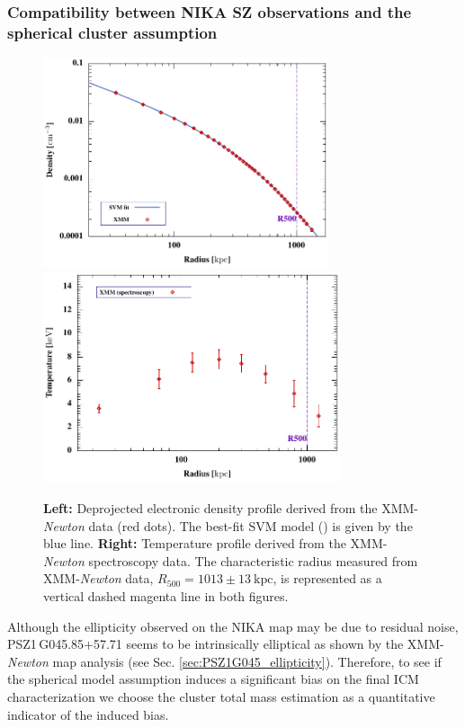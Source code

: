 \documentclass[traditabstract]{aa}
\begin{document}
\subsubsection{Compatibility between NIKA SZ observations and the spherical cluster assumption}\label{sec:impact_mass}
\begin{figure}[h]
\centering
\includegraphics[height=6.2cm]{NIKA_density_prof.pdf}
\hspace{0.7cm}
\includegraphics[height=6.2cm]{temperature_prof_XMM.pdf}
\caption{{\footnotesize \textbf{Left:} Deprojected electronic density profile derived from the XMM-{\it Newton} data (red dots). The best-fit SVM model (\citealt{SVM_prof}) is given by the blue line. \textbf{Right:} Temperature profile derived from the XMM-{\it Newton} spectroscopy data. The characteristic radius measured from XMM-{\it Newton} data, $R_{\mathrm{500}} = 1013 \pm 13~\mathrm{kpc}$, is represented as a vertical dashed magenta line in both figures.}}
\label{fig:XMM_density}
\end{figure}
Although the ellipticity observed on the NIKA map may be due to residual noise, \mbox{PSZ1\,G045.85+57.71} seems to be intrinsically elliptical as shown by the XMM-{\it Newton} map analysis (see Sec. \ref{sec:PSZ1G045_ellipticity}). Therefore, to see if the spherical model assumption induces a significant bias on the final ICM characterization we choose the cluster total mass estimation as a quantitative indicator of the induced bias.\\
\end{document}

